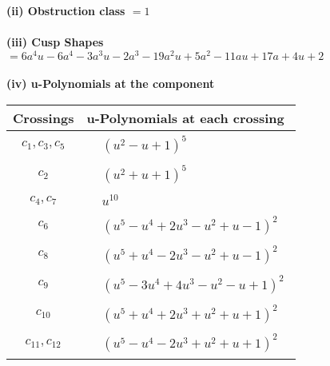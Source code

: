 \documentclass[1p]{elsarticle_modified}
\theoremstyle{definition}
\begin{document}
\flushleft \textbf{(ii) Obstruction class $= 1$}\\~\\
\flushleft \textbf{(iii) Cusp Shapes $= 6 a^4 u-6 a^4-3 a^3 u-2 a^3-19 a^2 u+5 a^2-11 a u+17 a+4 u+2$}\\~\\
\newpage\renewcommand{\arraystretch}{1}
\flushleft \textbf{(iv) u-Polynomials at the component}\newline \\
\begin{tabular}{m{50pt}|m{274pt}}
Crossings & \hspace{64pt}u-Polynomials at each crossing \\
\hline $$\begin{aligned}c_{1},c_{3},c_{5}\end{aligned}$$&$\begin{aligned}
&(u^2- u+1)^5
\end{aligned}$\\
\hline $$\begin{aligned}c_{2}\end{aligned}$$&$\begin{aligned}
&(u^2+u+1)^5
\end{aligned}$\\
\hline $$\begin{aligned}c_{4},c_{7}\end{aligned}$$&$\begin{aligned}
&u^{10}
\end{aligned}$\\
\hline $$\begin{aligned}c_{6}\end{aligned}$$&$\begin{aligned}
&(u^5- u^4+2 u^3- u^2+u-1)^2
\end{aligned}$\\
\hline $$\begin{aligned}c_{8}\end{aligned}$$&$\begin{aligned}
&(u^5+u^4-2 u^3- u^2+u-1)^2
\end{aligned}$\\
\hline $$\begin{aligned}c_{9}\end{aligned}$$&$\begin{aligned}
&(u^5-3 u^4+4 u^3- u^2- u+1)^2
\end{aligned}$\\
\hline $$\begin{aligned}c_{10}\end{aligned}$$&$\begin{aligned}
&(u^5+u^4+2 u^3+u^2+u+1)^2
\end{aligned}$\\
\hline $$\begin{aligned}c_{11},c_{12}\end{aligned}$$&$\begin{aligned}
&(u^5- u^4-2 u^3+u^2+u+1)^2
\end{aligned}$\\
\hline
\end{tabular}\\~\\
\end{document}
